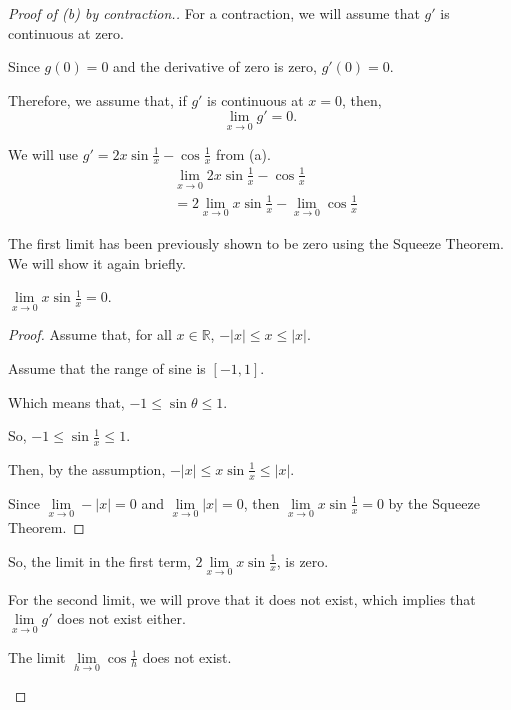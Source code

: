 \documentclass[../hw3.tex]{subfiles}
\begin{document}
\begin{proof}[Proof of (b) by contraction.]

    For a contraction, we will assume that $g'$ is continuous at zero. 

    Since $g(0)=0$ and the derivative of zero is zero, $g'(0)=0$.

    Therefore, we assume that, if $g'$ is continuous at $x=0$, then, 
    \[\lim\limits_{x \to 0} g' = 0.\]
    
    We will use $g' = 2x\sin{\frac{1}{x}} - \cos{\frac{1}{x}}$ from (a).
    \begin{align*}
        & \lim\limits_{x \to 0} 2x\sin{\frac{1}{x}} - \cos{\frac{1}{x}} \\
        &= 2\lim\limits_{x \to 0} x\sin{\frac{1}{x}} - \lim\limits_{x \to 0} \cos{\frac{1}{x}}
    \end{align*}

    The first limit has been previously shown to be zero using the Squeeze Theorem. We will show it again briefly.
    
    \begin{proposition}
        $\lim\limits_{x \to 0} x\sin{\frac{1}{x}} = 0$.
    \end{proposition}

    \begin{proof}
        Assume that, for all $x \in \mathbb{R}$, $-|x| \leq x \leq |x|$.

        Assume that the range of sine is $[-1,1]$.

        Which means that, $-1 \leq \sin{\theta} \leq 1$.

        So, $-1 \leq \sin{\frac{1}{x}} \leq 1$.

        Then, by the assumption, $-|x| \leq x\sin{\frac{1}{x}} \leq |x|$.

        Since $\lim\limits_{x \to 0} -|x| = 0$ and $\lim\limits_{x \to 0} |x| = 0$, then $\lim\limits_{x \to 0} x\sin{\frac{1}{x}} = 0$ by the Squeeze Theorem.
    \end{proof}

    So, the limit in the first term, $2 \lim\limits_{x \to 0} x\sin{\frac{1}{x}}$, is zero. 

    For the second limit, we will prove that it does not exist, which implies that $\lim\limits_{x \to 0} g'$ does not exist either.

    \begin{proposition}
        The limit $\lim\limits_{h \to 0} \cos{\frac{1}{h}}$ does not exist.
    \end{proposition}


\end{proof}
\end{document}
